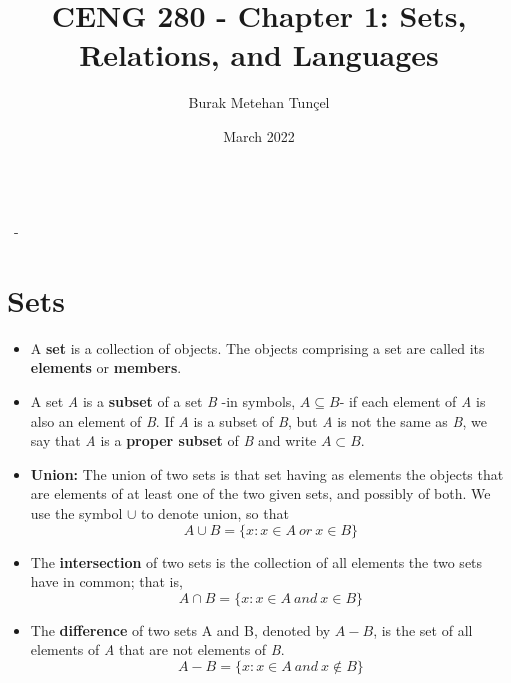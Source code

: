 \documentclass{article}
\title{CENG 280 - Chapter 1: Sets, Relations, and Languages}
\author{Burak Metehan Tunçel}
\date{March 2022}
\makeatletter
\renewcommand\maketitle{
{\raggedright %
\begin{center}
{\Large \bfseries \@title}\\[2ex] 
{\large \@author \ - \@date}\\[2ex]
\end{center}}} %
\makeatother
\begin{document}
\maketitle

\section{Sets}

\begin{multicols}{2}
\setlength{\columnsep}{1.5cm}
\setlength{\columnseprule}{0.2pt}

\begin{itemize}
    \item A \textbf{set} is a collection of objects. The objects comprising a set are called its \textbf{elements} or \textbf{members}.
    \item A set \textit{A} is a \textbf{subset} of a set \textit{B} -in symbols, $A \subseteq B$- if each element of \textit{A} is also an element of \textit{B}. If \textit{A} is a subset of \textit{B}, but \textit{A} is not the same as \textit{B}, we say that \textit{A} is a \textbf{proper subset} of \textit{B} and write $A \subset B$.
    \item \textbf{Union:} The union of two sets is that set having as elements the objects that are elements of at least one of the two given sets, and possibly of both. We use the symbol $\cup$ to denote union, so that
        \begin{equation*}
            A \cup B = \{x : x \in A\ or\ x \in B\}
        \end{equation*}
    \item The \textbf{intersection} of two sets is the collection of all elements the two sets have in common; that is,
        \begin{equation*}
            A \cap B = \{x : x \in A\ and\ x \in B\}
        \end{equation*}
    \item The \textbf{difference} of two sets A and B, denoted by $A - B$, is the set of all elements of \textit{A} that are not elements of \textit{B}.
        \begin{equation*}
            A - B = \{x: x \in A\ and\ x \notin B\}
        \end{equation*}

\end{itemize}
\end{multicols}
\end{document}

